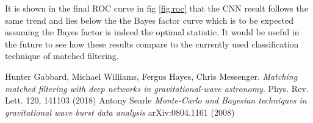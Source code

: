 \documentclass[12pt, letterpaper, twoside]{article}
\begin{document}
It is shown in the final ROC curve in fig \ref{fig:roc} that the CNN result follows the same trend and lies below the the Bayes factor curve which is to be expected assuming the Bayes factor is indeed the optimal statistic. It would be useful in the future to see how these results compare to the currently used classification technique of matched filtering.
\begin{thebibliography}{9}
Hunter Gabbard, Michael Williams, Fergus Hayes, Chris Messenger.
\textit{Matching matched filtering with deep networks in gravitational-wave astronomy}. 
Phys. Rev. Lett. 120, 141103 (2018)
Antony Searle
\textit{Monte-Carlo and Bayesian techniques in gravitational wave burst data analysis}
 	arXiv:0804.1161 (2008)
\end{thebibliography}
\end{document}
